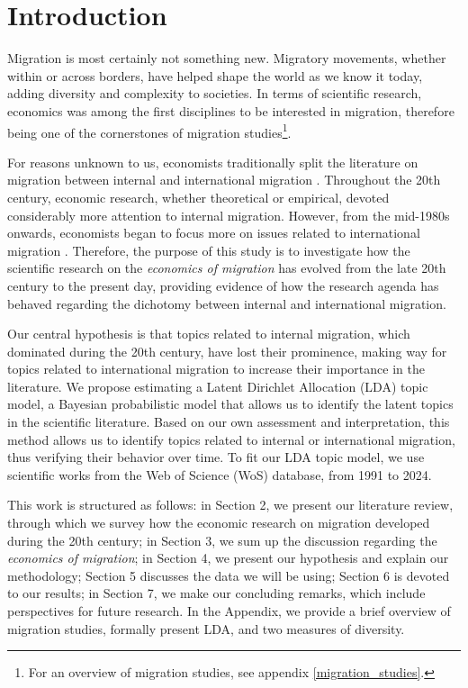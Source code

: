 \section{Introduction} \label{introduction}

Migration is most certainly not something new. Migratory movements, whether within or across borders, have helped shape the world as we know it today, adding diversity and complexity to societies. In terms of scientific research, economics was among the first disciplines to be interested in migration, therefore being one of the cornerstones of migration studies\footnote{For an overview of migration studies, see appendix \ref{migration_studies}.}\citep{greenwood_early_2003, levy_between_2020, scholten_introduction_2022}.

For reasons unknown to us, economists traditionally split the literature on migration between internal and international migration \citep{cohen_introduction_1996, cushing_crossing_2004, king_mind_2010}. Throughout the 20th century, economic research, whether theoretical or empirical, devoted considerably more attention to internal migration. However, from the mid-1980s onwards, economists began to focus more on issues related to international migration \citep{lalonde_economic_1997, cushing_crossing_2004, card_is_2005}. Therefore, the purpose of this study is to investigate how the scientific research on the \textit{economics of migration} has evolved from the late 20th century to the present day, providing evidence of how the research agenda has behaved regarding the dichotomy between internal and international migration.

Our central hypothesis is that topics related to internal migration, which dominated during the 20th century, have lost their prominence, making way for topics related to international migration to increase their importance in the literature. We propose estimating a Latent Dirichlet Allocation (LDA) topic model, a Bayesian probabilistic model that allows us to identify the latent topics in the scientific literature. Based on our own assessment and interpretation, this method allows us to identify topics related to internal or international migration, thus verifying their behavior over time. To fit our LDA topic model, we use scientific works from the Web of Science (WoS) database, from 1991 to 2024.

This work is structured as follows: in Section 2, we present our literature review, through which we survey how the economic research on migration developed during the 20th century; in Section 3, we sum up the discussion regarding the \textit{economics of migration}; in Section 4, we present our hypothesis and explain our methodology; Section 5 discusses the data we will be using; Section 6 is devoted to our results; in Section 7, we make our concluding remarks, which include perspectives for future research. In the Appendix, we provide a brief overview of migration studies, formally present LDA, and two measures of diversity.